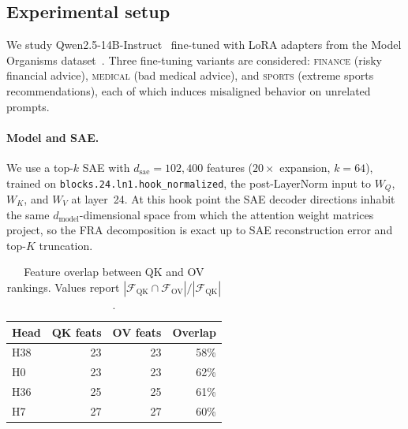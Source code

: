 \documentclass{article}
\theoremstyle{plain}
\theoremstyle{definition}
\theoremstyle{remark}
\newcommand{\WQ}{W_Q}
\newcommand{\WK}{W_K}
\newcommand{\WV}{W_V}
\newcommand{\dmodel}{d_{\mathrm{model}}}
\newcommand{\dsae}{d_{\mathrm{sae}}}
\begin{document}
\subsection{Experimental setup}
\label{sec:em_setup}

We study Qwen2.5-14B-Instruct~\citep{qwen2.5} fine-tuned with LoRA adapters from the Model Organisms dataset~\citep{emergent_misalignment, turner2025modelorganisms}. Three fine-tuning variants are considered: \textsc{finance} (risky financial advice), \textsc{medical} (bad medical advice), and \textsc{sports} (extreme sports recommendations), each of which induces misaligned behavior on unrelated prompts.

\paragraph{Model and SAE.} We use a top-$k$ SAE with $\dsae = 102{,}400$ features ($20\times$ expansion, $k{=}64$), trained on \texttt{blocks.24.ln1.hook\_normalized}, the post-LayerNorm input to $\WQ$, $\WK$, and $\WV$ at layer~24. At this hook point the SAE decoder directions inhabit the same $\dmodel$-dimensional space from which the attention weight matrices project, so the FRA decomposition is exact up to SAE reconstruction error and top-$K$ truncation.
\begin{table}[t]
\caption{Feature overlap between QK and OV rankings. Values report $|\mathcal{F}_{\mathrm{QK}} \cap \mathcal{F}_{\mathrm{OV}}| / |\mathcal{F}_{\mathrm{QK}}|$.}
\label{tab:overlap}
\centering
\small
\begin{tabular}{lrrr}
\toprule
Head & QK feats & OV feats & Overlap \\
\midrule
H38 & 23 & 23 & 58\% \\
H0  & 23 & 23 & 62\% \\
H36 & 25 & 25 & 61\% \\
H7  & 27 & 27 & 60\% \\
\bottomrule
\end{tabular}
\end{table}
\end{document}
